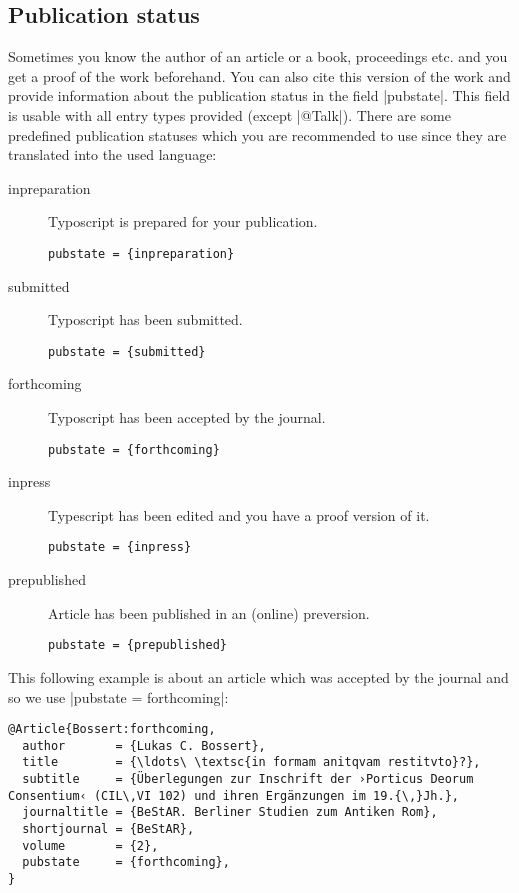 \documentclass[a4paper,
10pt,
greek,
french,
spanish,
italian,
ngerman,
english
]{ltxdoc}
\begin{document}
\subsection{Publication status}
Sometimes you know the author of an article or a book, proceedings etc. and you get a proof of the work beforehand.
You can also cite this version of the work and provide information about the publication status in the field |pubstate|.
This field is usable with all entry types provided (except |@Talk|).
There are some predefined publication statuses which you are recommended to use since they are translated into the used language:
\begin{description}
\item[inpreparation] Typoscript is prepared for your publication. 
\begin{lstlisting}
pubstate = {inpreparation}
\end{lstlisting}
\item[submitted] Typoscript has been submitted.

\begin{lstlisting}
pubstate = {submitted}
\end{lstlisting}

\item[forthcoming] Typoscript has been accepted by the journal.

\begin{lstlisting}
pubstate = {forthcoming}
\end{lstlisting}

\item[inpress] Typescript has been edited and you have a proof version of it.

\begin{lstlisting}
pubstate = {inpress}
\end{lstlisting}

\item[prepublished] Article has been published in an (online) preversion.

\begin{lstlisting}
pubstate = {prepublished}
\end{lstlisting}

\end{description}
This following example is about an article which was accepted by the journal and so we use |pubstate = {forthcoming}|:
\begin{lstlisting}[style=bibentry,label=Bossert:forthcoming,caption={{@}Article\{Bossert:forthcoming,…\} }]
@Article{Bossert:forthcoming,
  author       = {Lukas C. Bossert},
  title        = {\ldots\ \textsc{in formam anitqvam restitvto}?},
  subtitle     = {Überlegungen zur Inschrift der ›Porticus Deorum Consentium‹ (CIL\,VI 102) und ihren Ergänzungen im 19.{\,}Jh.},
  journaltitle = {BeStAR. Berliner Studien zum Antiken Rom},
  shortjournal = {BeStAR},
  volume       = {2},
  pubstate     = {forthcoming},
}
\end{lstlisting}
\end{document}
